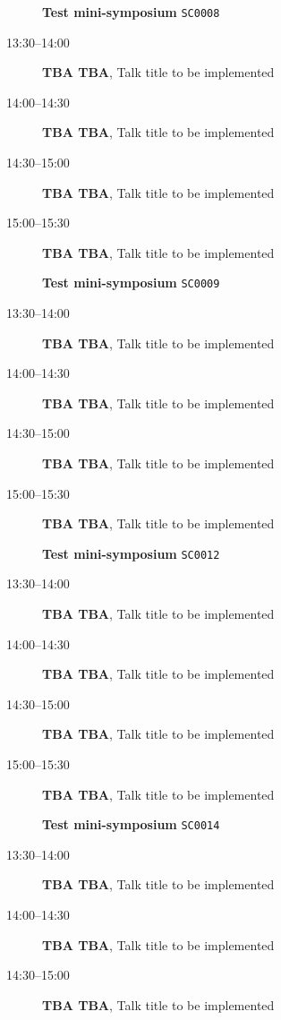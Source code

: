 \documentclass[ILAS2025-program.tex]{subfiles}
\begin{document}
\begin{description}
    \begin{description}
    \item[] \textbf{Test mini-symposium} {\footnotesize\texttt{SC0008}}
    \item[13:30--14:00] \textbf{TBA TBA}, Talk title to be implemented
        \item[14:00--14:30] \textbf{TBA TBA}, Talk title to be implemented
        \item[14:30--15:00] \textbf{TBA TBA}, Talk title to be implemented
        \item[15:00--15:30] \textbf{TBA TBA}, Talk title to be implemented
        \end{description}
    \begin{description}
    \item[] \textbf{Test mini-symposium} {\footnotesize\texttt{SC0009}}
    \item[13:30--14:00] \textbf{TBA TBA}, Talk title to be implemented
        \item[14:00--14:30] \textbf{TBA TBA}, Talk title to be implemented
        \item[14:30--15:00] \textbf{TBA TBA}, Talk title to be implemented
        \item[15:00--15:30] \textbf{TBA TBA}, Talk title to be implemented
        \end{description}
    \begin{description}
    \item[] \textbf{Test mini-symposium} {\footnotesize\texttt{SC0012}}
    \item[13:30--14:00] \textbf{TBA TBA}, Talk title to be implemented
        \item[14:00--14:30] \textbf{TBA TBA}, Talk title to be implemented
        \item[14:30--15:00] \textbf{TBA TBA}, Talk title to be implemented
        \item[15:00--15:30] \textbf{TBA TBA}, Talk title to be implemented
        \end{description}
    \begin{description}
    \item[] \textbf{Test mini-symposium} {\footnotesize\texttt{SC0014}}
    \item[13:30--14:00] \textbf{TBA TBA}, Talk title to be implemented
        \item[14:00--14:30] \textbf{TBA TBA}, Talk title to be implemented
        \item[14:30--15:00] \textbf{TBA TBA}, Talk title to be implemented

\end{description}
\end{description}
\end{document}
